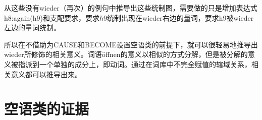从这些没有wieder（再次）的例句中推导出这些统制图，需要做的只是增加表达式h8:again(h9)和支配要求，要求$h9$统制出现在wieder右边的量词，要求h9被wieder左边的量词统制。

所以在不借助为CAUSE和BECOME设置空语类的前提下，就可以很轻易地推导出wieder所修饰的相关意义。词语öffnen的意义以相似的方式分解，但是被分解的意义被指派到一个单独的成分上，即动词。通过在词库中不完全赋值的辖域关系，相关意义都可以推导出来。



\section{空语类的证据}
\label{Abschnitt-Evidenz-leere-Elemente}

